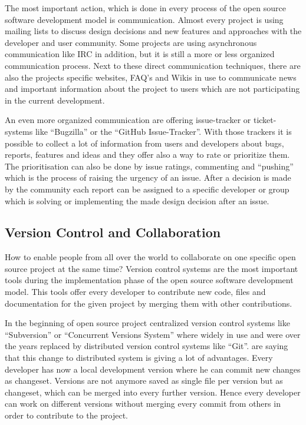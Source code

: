 \documentclass[DIV=calc,paper=a4,fontsize=9pt,twocolumn]{scrartcl}
\begin{document}
The most important action, which is done in every process of the open source software development model is communication. Almost every project is using mailing lists to discuss design decisions and new features and approaches with the developer and user community. Some projects are using asynchronous communication like IRC in addition, but it is still a more or less organized communication process. Next to these direct communication techniques, there are also the projects specific websites, FAQ's and Wikis in use to communicate news and important information about the project to users which are not participating in the current development. \citep{ApacheFoundation13} 

An even more organized communication are offering issue-tracker or ticket-systems like \enquote{Bugzilla} or the \enquote{GitHub Issue-Tracker}. With those trackers it is possible to collect a lot of information from users and developers about bugs, reports, features and ideas and they offer also a way to rate or prioritize them. The prioritisation can also be done by issue ratings, commenting and \enquote{pushing} which is the process of raising the urgency of an issue. After a decision is made by the community each report can be assigned to a specific developer or group which is solving or implementing the made design decision after an issue.

\subsection{Version Control and Collaboration}

How to enable people from all over the world to collaborate on one specific open source project at the same time? Version control systems are the most important tools during the implementation phase of the open source software development model. This tools offer every developer to contribute new code, files and documentation for the given project by merging them with other contributions. 

In the beginning of open source project centralized version control systems like \enquote{Subversion} or \enquote{Concurrent Versions System} where widely in use and were over the years replaced by distributed version control systems like \enquote{Git}. \citet{rodriguez2012distributed} are saying that this change to distributed system is giving a lot of advantages. Every developer has now a local development version where he can commit new changes as changeset. Versions are not anymore saved as single file per version but as changeset, which can be merged into every further version. Hence every developer can work on different versions without merging every commit from others in order to contribute to the project.
\end{document}
